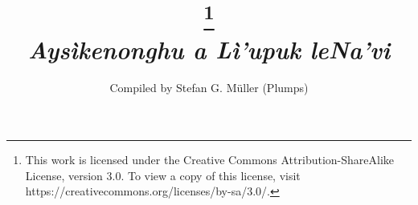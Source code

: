 \documentclass[a4paper,11pt]{report}
\begin{document}
\title{\footnote{This work is licensed under the Creative Commons Attribution-ShareAlike License, version 3.0. To view a copy of this license, visit https://creativecommons.org/licenses/by-sa/3.0/.} \\
\emph{Aysìkenonghu a Lì'upuk leNa'vi}}
\author{Compiled by Stefan G. M\"uller (Plumps)}
\date{\DictionaryReleaseDate}

\DictionaryMakeTitle



% 
 
% 
 


% 


% 



 
 






 


 


 
 

 


 


 

\end{document}

